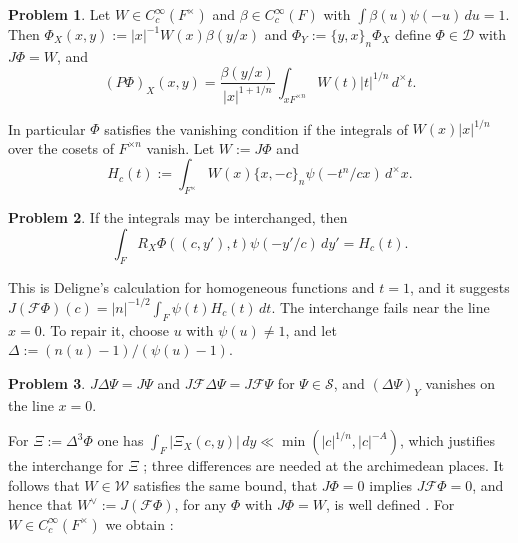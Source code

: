 \documentclass[reqno]{amsart}
\newcommand{\Fc}{\mathcal{F}}
\newcommand{\Dc}{\mathcal{D}}
\newcommand{\Sc}{\mathcal{S}}
\newcommand{\Wc}{\mathcal{W}}
\numberwithin{equation}{section}
\theoremstyle{definition}
\newtheorem{problem}{Problem}[section]
\theoremstyle{plain}
\begin{document}
\begin{problem}\label{pr:jacquet-surj}
  Let $W \in C_c^\infty(F^\times)$ and $\beta \in C_c^\infty(F)$ with $\int \beta(u) \psi(-u) \, d u = 1$.  Then $\Phi_X(x, y) := \lvert x \rvert^{-1} W(x) \beta(y / x)$ and $\Phi_Y := \{y, x\}_n \Phi_X$ define $\Phi \in \Dc$ with $J \Phi = W$, and
  \begin{equation*}
    (P \Phi)_X(x, y) = \frac{\beta(y / x)}{\lvert x \rvert^{1 + 1/n}} \int_{x F^{\times n}} W(t) \lvert t \rvert^{1/n} \, d^\times t.
  \end{equation*}
\end{problem}

In particular $\Phi$ satisfies the vanishing condition if the integrals of $W(x) \lvert x \rvert^{1/n}$ over the cosets of $F^{\times n}$ vanish.  Let $W := J \Phi$ and
\begin{equation*}
  H_c(t) := \int_{F^\times} W(x) \{x, -c\}_n \psi(- t^n / c x) \, d^\times x.
\end{equation*}

\begin{problem}\label{pr:formal-kernel}
  If the integrals may be interchanged, then
  \begin{equation*}
    \int_F R_X \Phi((c, y'), t) \psi(- y' / c) \, d y' = H_c(t).
  \end{equation*}
\end{problem}

This is Deligne's calculation \cite[(6.5.4)]{Del} for homogeneous functions and $t = 1$, and it suggests $J(\Fc \Phi)(c) = \lvert n \rvert^{-1/2} \int_F \psi(t) H_c(t) \, d t$.  The interchange fails near the line $x = 0$.  To repair it, choose $u$ with $\psi(u) \neq 1$, and let $\Delta := (n(u) - 1) / (\psi(u) - 1)$.

\begin{problem}\label{pr:third-difference}
  $J \Delta \Psi = J \Psi$ and $J \Fc \Delta \Psi = J \Fc \Psi$ for $\Psi \in \Sc$, and $(\Delta \Psi)_Y$ vanishes on the line $x = 0$.
\end{problem}

For $\Xi := \Delta^3 \Phi$ one has $\int_F \lvert \Xi_X(c, y) \rvert \, d y \ll \min(\lvert c \rvert^{1/n}, \lvert c \rvert^{-A})$, which justifies the interchange for $\Xi$ \cite[Lemma~10.3]{N}; three differences are needed at the archimedean places.  It follows that $W \in \Wc$ satisfies the same bound, that $J \Phi = 0$ implies $J \Fc \Phi = 0$, and hence that $W^\vee := J(\Fc \Phi)$, for any $\Phi$ with $J \Phi = W$, is well defined \cite[Proposition~10.5, Corollary~10.6]{N}.  For $W \in C_c^\infty(F^\times)$ we obtain \cite[Proposition~10.8]{N}:
\end{document}
